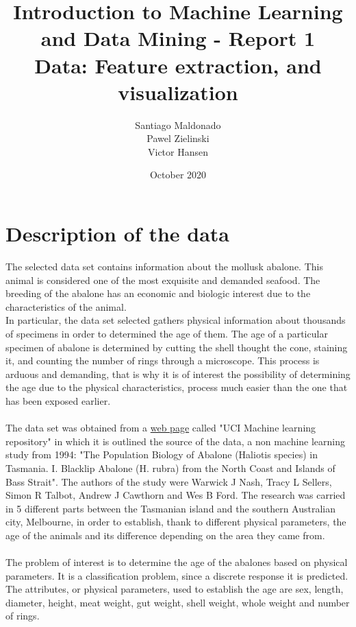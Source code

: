 \documentclass{report}
\begin{document}
\begin{titlepage}
    \title{\textbf{Introduction to Machine Learning and Data Mining - Report 1} \\
    \LARGE{Data:  Feature extraction, and visualization}}
    
    \author{Santiago Maldonado\\ Pawel Zielinski \\ Victor Hansen }
    \date{October 2020}

\end{titlepage}
\maketitle

\newpage
\tableofcontents
\listoffigures
\listoftables

\newpage
\setcounter{page}{1}

\chapter{Description of the data}
The selected data set contains information about the mollusk abalone. This animal is considered one of the most exquisite and demanded seafood. The breeding of the abalone has an economic and biologic interest due to the characteristics of the animal.\\
In particular, the data set selected gathers physical information about thousands of specimens in order to determined the age of them. The age of a particular specimen of abalone is determined by cutting the shell thought the cone, staining it, and counting the number of rings through a microscope. This process is arduous and demanding, that is why it is of interest the possibility of determining the age due to the physical characteristics, process much easier than the one that has been exposed earlier.\\
\\
The data set was obtained from a \href{https://archive.ics.uci.edu/ml/datasets/Abalone}{web page} called "UCI Machine learning repository" in which it is outlined the source of the data, a non machine learning study from 1994: "The Population Biology of Abalone (Haliotis species) in Tasmania. I. Blacklip Abalone (H. rubra) from the North Coast and Islands of Bass Strait". The authors of the study were Warwick J Nash, Tracy L Sellers, Simon R Talbot, Andrew J Cawthorn and Wes B Ford. The research was carried in 5 different parts between the Tasmanian island and the southern Australian city, Melbourne, in order to establish, thank to different physical parameters, the age of the animals and its difference depending on the area they came from. \\
\\
The problem of interest is to determine the age of the abalones based on physical parameters. It is a classification problem, since a discrete response it is predicted. The attributes, or physical parameters, used to establish the age are sex, length, diameter, height, meat weight, gut weight, shell weight, whole weight and number of rings.   
\end{document}

